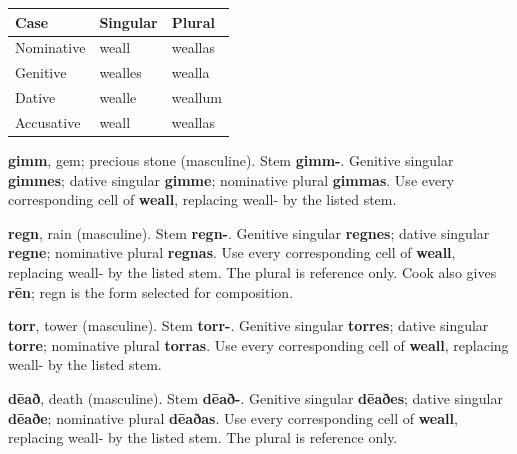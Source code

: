 \par\begingroup
\fontsize{10.5}{13.2}\selectfont
\setlength{\LTleft}{0pt}\setlength{\LTright}{\fill}
\noindent
\begin{tabular}{@{}>{\raggedright\arraybackslash}p{39.46mm}>{\raggedright\arraybackslash}p{39.46mm}>{\raggedright\arraybackslash}p{39.46mm}@{}}
\toprule
\textbf{Case} & \textbf{Singular} & \textbf{Plural} \\
\midrule
Nominative & weall & weallas \\
Genitive & wealles & wealla \\
Dative & wealle & weallum \\
Accusative & weall & weallas \\
\bottomrule
\end{tabular}
\par\endgroup

\textbf{gimm}, gem; precious stone (masculine). Stem \textbf{gimm-}. Genitive singular \textbf{gimmes}; dative singular \textbf{gimme}; nominative plural \textbf{gimmas}. Use every corresponding cell of \textbf{weall}, replacing weall- by the listed stem.

\textbf{regn}, rain (masculine). Stem \textbf{regn-}. Genitive singular \textbf{regnes}; dative singular \textbf{regne}; nominative plural \textbf{regnas}. Use every corresponding cell of \textbf{weall}, replacing weall- by the listed stem. The plural is reference only. Cook also gives \textbf{rēn}; regn is the form selected for composition.

\textbf{torr}, tower (masculine). Stem \textbf{torr-}. Genitive singular \textbf{torres}; dative singular \textbf{torre}; nominative plural \textbf{torras}. Use every corresponding cell of \textbf{weall}, replacing weall- by the listed stem.

\textbf{dēað}, death (masculine). Stem \textbf{dēað-}. Genitive singular \textbf{dēaðes}; dative singular \textbf{dēaðe}; nominative plural \textbf{dēaðas}. Use every corresponding cell of \textbf{weall}, replacing weall- by the listed stem. The plural is reference only.

